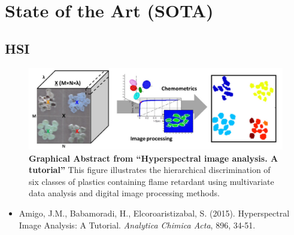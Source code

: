 \documentclass[10pt,svgnames,fragile]{beamer}
\begin{document}
\section{State of the Art (SOTA)}

\subsection{HSI}
\begin{frame}{}
\tiny
\begin{figure}
    \centering
    \includegraphics[width=0.62\linewidth]{tutorial_figure.png}
    \caption{\textbf{Graphical Abstract from “Hyperspectral image analysis. A tutorial”} This figure illustrates the hierarchical discrimination of six classes of plastics containing flame retardant using multivariate data analysis and digital image processing methods.\cite{amigoHyperspectralImageAnalysis2015}}
    \label{fig:tutorial_figure}
\end{figure}
\vspace{-0.5cm}
\begin{itemize}
    \item Amigo, J.M., Babamoradi, H., Elcoroaristizabal, S. (2015). Hyperspectral Image Analysis: A Tutorial. \textit{Analytica Chimica Acta}, 896, 34-51. \href{https://www.sciencedirect.com/science/article/pii/S0003267015011691}{\color{blue}{DOI: 10.1016/j.aca.2015.09.030}}
    \cite{amigoHyperspectralImageAnalysis2015}
    

\end{itemize}
\end{frame}
\end{document}
